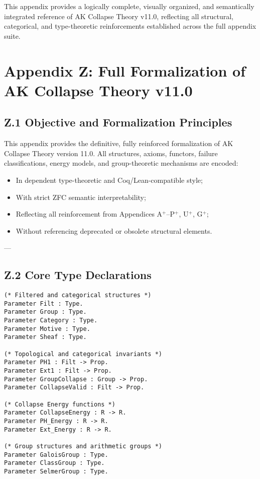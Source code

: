 \documentclass[11pt]{article}
\begin{document}
This appendix provides a logically complete, visually organized, and semantically integrated reference of AK Collapse Theory v11.0, reflecting all structural, categorical, and type-theoretic reinforcements established across the full appendix suite.




\section*{Appendix Z: Full Formalization of AK Collapse Theory v11.0}

\subsection*{Z.1 Objective and Formalization Principles}

This appendix provides the definitive, fully reinforced formalization of AK Collapse Theory version 11.0.  
All structures, axioms, functors, failure classifications, energy models, and group-theoretic mechanisms are encoded:  

\begin{itemize}
    \item In dependent type-theoretic and Coq/Lean-compatible style;
    \item With strict ZFC semantic interpretability;
    \item Reflecting all reinforcement from Appendices A$^{+}$–P$^{+}$, U$^{+}$, G$^{+}$;
    \item Without referencing deprecated or obsolete structural elements.
\end{itemize}

---

\subsection*{Z.2 Core Type Declarations}

\begin{lstlisting}[language=Coq]
(* Filtered and categorical structures *)
Parameter Filt : Type.
Parameter Group : Type.
Parameter Category : Type.
Parameter Motive : Type.
Parameter Sheaf : Type.

(* Topological and categorical invariants *)
Parameter PH1 : Filt -> Prop.
Parameter Ext1 : Filt -> Prop.
Parameter GroupCollapse : Group -> Prop.
Parameter CollapseValid : Filt -> Prop.

(* Collapse Energy functions *)
Parameter CollapseEnergy : R -> R.
Parameter PH_Energy : R -> R.
Parameter Ext_Energy : R -> R.

(* Group structures and arithmetic groups *)
Parameter GaloisGroup : Type.
Parameter ClassGroup : Type.
Parameter SelmerGroup : Type.
\end{lstlisting}
\end{document}
